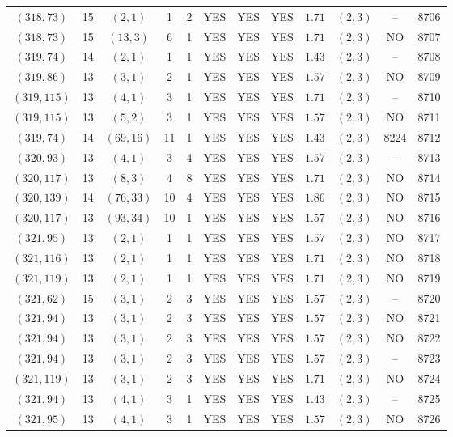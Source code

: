 \begin{longtable}{|c|c|c|c|c|c|c|c|c|c|c|c|}
$(318,73)$ & 15 & $(2,1)$ & 1 & 2 & YES & YES & YES & $1.71$ & $(2,3)$ & -- & 8706\\
$(318,73)$ & 15 & $(13,3)$ & 6 & 1 & YES & YES & YES & $1.71$ & $(2,3)$ & NO & 8707\\
$(319,74)$ & 14 & $(2,1)$ & 1 & 1 & YES & YES & YES & $1.43$ & $(2,3)$ & -- & 8708\\
$(319,86)$ & 13 & $(3,1)$ & 2 & 1 & YES & YES & YES & $1.57$ & $(2,3)$ & NO & 8709\\
$(319,115)$ & 13 & $(4,1)$ & 3 & 1 & YES & YES & YES & $1.71$ & $(2,3)$ & -- & 8710\\
$(319,115)$ & 13 & $(5,2)$ & 3 & 1 & YES & YES & YES & $1.57$ & $(2,3)$ & NO & 8711\\
$(319,74)$ & 14 & $(69,16)$ & 11 & 1 & YES & YES & YES & $1.43$ & $(2,3)$ & 8224 & 8712\\
$(320,93)$ & 13 & $(4,1)$ & 3 & 4 & YES & YES & YES & $1.57$ & $(2,3)$ & -- & 8713\\
$(320,117)$ & 13 & $(8,3)$ & 4 & 8 & YES & YES & YES & $1.71$ & $(2,3)$ & NO & 8714\\
$(320,139)$ & 14 & $(76,33)$ & 10 & 4 & YES & YES & YES & $1.86$ & $(2,3)$ & NO & 8715\\
$(320,117)$ & 13 & $(93,34)$ & 10 & 1 & YES & YES & YES & $1.57$ & $(2,3)$ & NO & 8716\\
$(321,95)$ & 13 & $(2,1)$ & 1 & 1 & YES & YES & YES & $1.57$ & $(2,3)$ & NO & 8717\\
$(321,116)$ & 13 & $(2,1)$ & 1 & 1 & YES & YES & YES & $1.71$ & $(2,3)$ & NO & 8718\\
$(321,119)$ & 13 & $(2,1)$ & 1 & 1 & YES & YES & YES & $1.71$ & $(2,3)$ & NO & 8719\\
$(321,62)$ & 15 & $(3,1)$ & 2 & 3 & YES & YES & YES & $1.57$ & $(2,3)$ & -- & 8720\\
$(321,94)$ & 13 & $(3,1)$ & 2 & 3 & YES & YES & YES & $1.57$ & $(2,3)$ & NO & 8721\\
$(321,94)$ & 13 & $(3,1)$ & 2 & 3 & YES & YES & YES & $1.57$ & $(2,3)$ & NO & 8722\\
$(321,94)$ & 13 & $(3,1)$ & 2 & 3 & YES & YES & YES & $1.57$ & $(2,3)$ & -- & 8723\\
$(321,119)$ & 13 & $(3,1)$ & 2 & 3 & YES & YES & YES & $1.71$ & $(2,3)$ & NO & 8724\\
$(321,94)$ & 13 & $(4,1)$ & 3 & 1 & YES & YES & YES & $1.43$ & $(2,3)$ & -- & 8725\\
$(321,95)$ & 13 & $(4,1)$ & 3 & 1 & YES & YES & YES & $1.57$ & $(2,3)$ & NO & 8726\\

\end{longtable}
